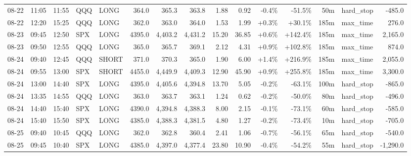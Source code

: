 \documentclass[11pt,a4paper,twoside]{article}
\begin{document}
\begin{landscape}
\begin{center}
\begin{longtable}{>{\color{txtmain}}l l l l l r r r r r r r r >{\color{txtmain}}l r}
08-22 & 11:05 & 11:55 & QQQ & LONG & 364.0 & 365.3 & 363.8 & 1.88 & 0.92 & \textcolor{lossred}{-0.4\%} & \textcolor{lossred}{-51.5\%} & 50m & hard\_stop & \textcolor{lossred}{-485.0} \\
08-22 & 12:20 & 15:25 & QQQ & LONG & 362.0 & 363.0 & 364.0 & 1.53 & 1.99 & \textcolor{wingreen}{+0.3\%} & \textcolor{wingreen}{+30.1\%} & 185m & max\_time & \textcolor{wingreen}{276.0} \\
08-23 & 09:45 & 12:50 & SPX & LONG & 4395.0 & 4,403.2 & 4,431.2 & 15.20 & 36.85 & \textcolor{wingreen}{+0.6\%} & \textcolor{wingreen}{+142.4\%} & 185m & max\_time & \textcolor{wingreen}{2,165.0} \\
08-23 & 09:50 & 12:55 & QQQ & LONG & 365.0 & 365.7 & 369.1 & 2.12 & 4.31 & \textcolor{wingreen}{+0.9\%} & \textcolor{wingreen}{+102.8\%} & 185m & max\_time & \textcolor{wingreen}{874.0} \\
08-24 & 09:40 & 12:45 & QQQ & SHORT & 371.0 & 370.3 & 365.0 & 1.90 & 6.00 & \textcolor{wingreen}{+1.4\%} & \textcolor{wingreen}{+216.9\%} & 185m & max\_time & \textcolor{wingreen}{2,055.0} \\
08-24 & 09:55 & 13:00 & SPX & SHORT & 4455.0 & 4,449.9 & 4,409.3 & 12.90 & 45.90 & \textcolor{wingreen}{+0.9\%} & \textcolor{wingreen}{+255.8\%} & 185m & max\_time & \textcolor{wingreen}{3,300.0} \\
08-24 & 13:00 & 14:40 & SPX & LONG & 4395.0 & 4,405.6 & 4,394.8 & 13.70 & 5.05 & \textcolor{lossred}{-0.2\%} & \textcolor{lossred}{-63.1\%} & 100m & hard\_stop & \textcolor{lossred}{-865.0} \\
08-24 & 13:35 & 14:55 & QQQ & LONG & 363.0 & 363.7 & 363.1 & 1.24 & 0.62 & \textcolor{lossred}{-0.2\%} & \textcolor{lossred}{-50.0\%} & 80m & hard\_stop & \textcolor{lossred}{-496.0} \\
08-24 & 14:40 & 15:40 & SPX & LONG & 4390.0 & 4,394.8 & 4,388.3 & 8.00 & 2.15 & \textcolor{lossred}{-0.1\%} & \textcolor{lossred}{-73.1\%} & 60m & hard\_stop & \textcolor{lossred}{-585.0} \\
08-24 & 15:40 & 15:50 & SPX & LONG & 4385.0 & 4,388.3 & 4,381.5 & 4.80 & 1.27 & \textcolor{lossred}{-0.2\%} & \textcolor{lossred}{-73.4\%} & 10m & hard\_stop & \textcolor{lossred}{-705.0} \\
08-25 & 09:40 & 10:45 & QQQ & LONG & 362.0 & 362.8 & 360.4 & 2.41 & 1.06 & \textcolor{lossred}{-0.7\%} & \textcolor{lossred}{-56.1\%} & 65m & hard\_stop & \textcolor{lossred}{-540.0} \\
08-25 & 09:45 & 10:40 & SPX & LONG & 4385.0 & 4,397.0 & 4,377.4 & 23.80 & 10.90 & \textcolor{lossred}{-0.4\%} & \textcolor{lossred}{-54.2\%} & 55m & hard\_stop & \textcolor{lossred}{-1,290.0} \\

\end{longtable}
\end{center}
\end{landscape}
\end{document}
